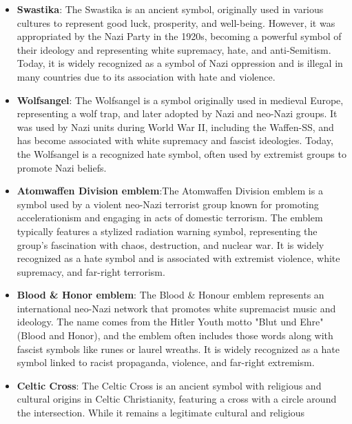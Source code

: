 \begin{itemize}
  symbol of the Nazi Party's paramilitary wing, known for its violent tactics
  and support for Adolf Hitler's rise to power. The emblem typically featured
  a stylized version of the SA initials, often accompanied by a swastika.
  It represented the SA's role in enforcing Nazi ideology and intimidation,
  and the emblem is now recognized as a symbol of hate and fascism.
  \item \textbf{Swastika}: The Swastika is an ancient symbol, originally used in
  various cultures to represent good luck, prosperity, and well-being. However,
  it was appropriated by the Nazi Party in the 1920s, becoming a powerful
  symbol of their ideology and representing white supremacy, hate, and
  anti-Semitism. Today, it is widely recognized as a symbol of Nazi oppression
  and is illegal in many countries due to its association with hate and violence.
  \item \textbf{Wolfsangel}: The Wolfsangel is a symbol originally used in medieval
  Europe, representing a wolf trap, and later adopted by Nazi and neo-Nazi
  groups. It was used by Nazi units during World War II, including the Waffen-SS,
  and has become associated with white supremacy and fascist ideologies. Today,
  the Wolfsangel is a recognized hate symbol, often used by extremist groups
  to promote Nazi beliefs.
  \item \textbf{Atomwaffen Division emblem}:The Atomwaffen Division emblem is a symbol
  used by a violent neo-Nazi terrorist group known for promoting accelerationism and
  engaging in acts of domestic terrorism. The emblem typically features a stylized
  radiation warning symbol, representing the group's fascination with chaos,
  destruction, and nuclear war. It is widely recognized as a hate symbol and is
  associated with extremist violence, white supremacy, and far-right terrorism.
  \item \textbf{Blood \& Honor emblem}: The Blood \& Honour emblem represents an international
  neo-Nazi network that promotes white supremacist music and ideology. The name comes
  from the Hitler Youth motto "Blut und Ehre" (Blood and Honor), and the emblem often
  includes those words along with fascist symbols like runes or laurel wreaths. It
  is widely recognized as a hate symbol linked to racist propaganda, violence,
  and far-right extremism.
  \item \textbf{Celtic Cross}: The Celtic Cross is an ancient symbol with religious
  and cultural origins in Celtic Christianity, featuring a cross with a circle
  around the intersection. While it remains a legitimate cultural and religious

\end{itemize}
